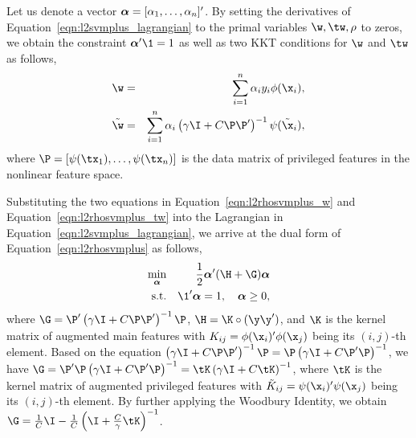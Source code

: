 Let us denote a vector $\bm{\alpha} = [\alpha_1, \ldots, \alpha_n]'$. By setting the derivatives of Equation~\ref{eqn:l2svmplus_lagrangian} \wrt to the primal variables $\w, \tw, \rho$ to zeros, we obtain the constraint $\ba'\1 = 1$ as well as two KKT conditions for $\w$ and $\tw$ as follows,
\begin{eqnarray}
\w &=& \sum_{i=1}^n\alpha_iy_i\phi(\x_i),\label{eqn:l2rhosvmplus_w}\\
\tilde{\w} &=& \sum_{i=1}^n\alpha_i\left(\gamma\I + C\P\P'\right)^{-1}\psi(\tilde{\x}_i),\label{eqn:l2rhosvmplus_tw}
\end{eqnarray}
where $\P = [\psi(\tx_1), \ldots, \psi(\tx_n)]$ is the data matrix of privileged features in the nonlinear feature space.

Substituting the two equations in Equation~\ref{eqn:l2rhosvmplus_w} and Equation~\ref{eqn:l2rhosvmplus_tw} into the Lagrangian in Equation~\ref{eqn:l2svmplus_lagrangian}, we arrive at the dual form of Equation~\ref{eqn:l2rhosvmplus} as follows,
\begin{eqnarray}\label{eqn:l2svmplus_dual}
\min_{\ba} && \frac{1}{2}\ba'(\H + \G)\ba\\
\mbox{s.t.} && \1'\ba = 1, \quad \ba \geq 0,\nonumber
\end{eqnarray}
where $\G = \P'\left(\gamma\I + C\P\P'\right)^{-1}\P$, $\H = \K\circ(\y\y')$, and $\K$ is the kernel matrix of augmented main features with $K_{ij} = \phi(\x_i)'\phi(\x_j)$ being its $(i,j)$-th element. Based on the equation $\left(\gamma\I + C\P\P'\right)^{-1}\P = \P\left(\gamma\I + C\P'\P\right)^{-1}$, we have $ \G = \P'\P\left(\gamma\I + C\P'\P\right)^{-1} = \tK\left(\gamma\I + C\tK\right)^{-1}$, where $\tK$ is the kernel matrix of augmented privileged features with $\tilde{K}_{ij} = \psi(\x_i)'\psi(\x_j)$ being its $(i,j)$-th element. By further applying the Woodbury Identity, we obtain $\G = \frac{1}{C}\I - \frac{1}{C}\left(\I+\frac{C}{\gamma}\tK\right)^{-1}$.

